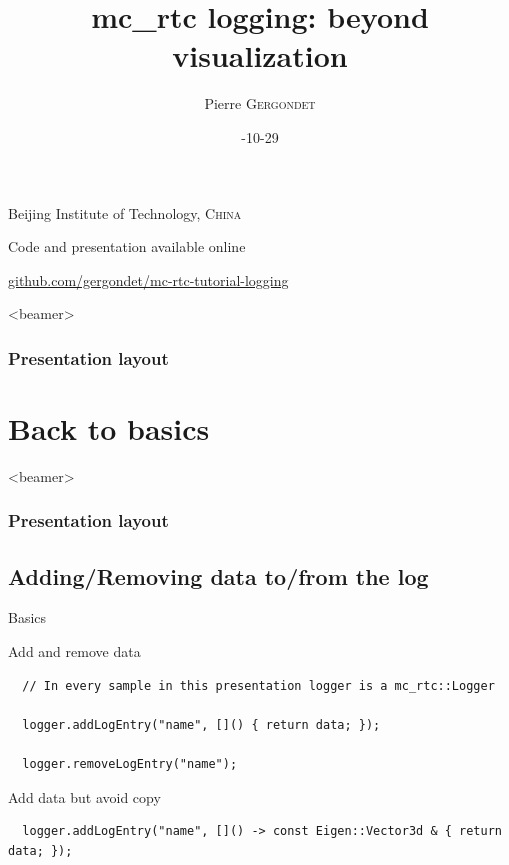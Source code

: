 \documentclass[c,aspectratio=169]{beamer}
\title[mc\_rtc logging: beyond visualization]{mc\_rtc logging: beyond visualization}
\author[\rmfamily P. \textsc{Gergondet}]{\rmfamily Pierre \textsc{Gergondet}}
\date{\rmfamily 2021-10-29}
\begin{document}
{
\begin{frame}
  \titlepage
  \begin{center}
    \vspace{-6.5em}
    \rmfamily Beijing Institute of Technology, \textsc{China}

    \vspace{4em}

    Code and presentation available online

    \hyperlink{https://github.com/gergondet/mc-rtc-tutorial-logging}{github.com/gergondet/mc-rtc-tutorial-logging}
  \end{center}
\end{frame}

\begin{frame}<beamer>
  \frametitle{Presentation layout}
  \setcounter{tocdepth}{1}
  \tableofcontents
\end{frame}
} %

\section{Back to basics}

\begin{frame}<beamer>
  \frametitle{Presentation layout}
  \setcounter{tocdepth}{2}
\end{frame}

\subsection{Adding/Removing data to/from the log}

\begin{frame}[fragile]{Basics}

  \begin{block}{Add and remove data}

\scriptsize
\begin{verbatim}
  // In every sample in this presentation logger is a mc_rtc::Logger

  logger.addLogEntry("name", []() { return data; });

  logger.removeLogEntry("name");
\end{verbatim}

  \end{block}

  \begin{block}{Add data but avoid copy}

\scriptsize
\begin{verbatim}
  logger.addLogEntry("name", []() -> const Eigen::Vector3d & { return data; });
\end{verbatim}

  \end{block}

\end{frame}
\end{document}
